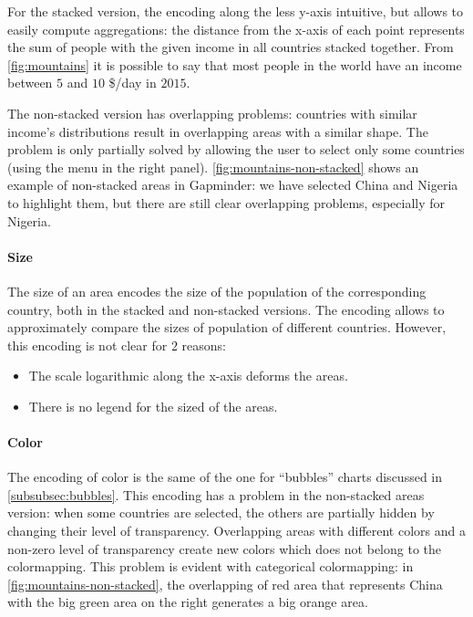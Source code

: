 For the stacked version, the encoding along the less y-axis intuitive, but allows to easily compute aggregations:
the distance from the x-axis of each point represents the sum of people with the given income in all countries stacked together.
From \cref{fig:mountains} it is possible to say that most people in the world have an income between $5$ and $10$ \$/day in $2015$.

The non-stacked version has overlapping problems:
countries with similar income's distributions result in overlapping areas with a similar shape.
The problem is only partially solved by allowing the user to select only some countries (using the menu in the right panel).
\cref{fig:mountains-non-stacked} shows an example of non-stacked areas in Gapminder:
we have selected China and Nigeria to highlight them, but there are still clear overlapping problems, especially for Nigeria.

\paragraph{Size}
The size of an area encodes the size of the population of the corresponding country, both in the stacked and non-stacked versions.
The encoding allows to approximately compare the sizes of population of different countries.
However, this encoding is not clear for $2$ reasons:
\begin{itemize}
	\item The scale logarithmic along the x-axis deforms the areas.
	\item There is no legend for the sized of the areas.
\end{itemize}

\paragraph{Color}
The encoding of color is the same of the one for ``bubbles'' charts discussed in \cref{subsubsec:bubbles}.
This encoding has a problem in the non-stacked areas version:
when some countries are selected, the others are partially hidden by changing their level of transparency.
Overlapping areas with different colors and a non-zero level of transparency create new colors which does not belong to the colormapping.
This problem is evident with categorical colormapping:
in \cref{fig:mountains-non-stacked}, the overlapping of red area that represents China with the big green area on the right generates a big orange area.

